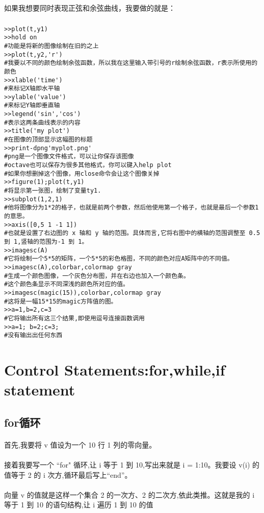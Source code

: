 \documentclass{article}
\begin{document}
\begin{CJK}{UTF8}{gbsn}
\paragraph{}
如果我想要同时表现正弦和余弦曲线，我要做的就是：
\subparagraph{}
\begin{verbatim}
>>plot(t,y1)
>>hold on
#功能是将新的图像绘制在旧的之上
>>plot(t,y2,'r')
#我要以不同的颜色绘制余弦函数，所以我在这里输入带引号的r绘制余弦函数，r表示所使用的颜色
>>xlable('time')
#来标记X轴即水平轴
>>ylable('value')
#来标记Y轴即垂直轴
>>legend('sin','cos')
#表示这两条曲线表示的内容
>>title('my plot')
#在图像的顶部显示这幅图的标题
>>print-dpng'myplot.png'
#png是一个图像文件格式，可以让你保存该图像
#octave也可以保存为很多其他格式，你可以键入help plot
#如果你想删掉这个图像，用close命令会让这个图像关掉
>>figure(1);plot(t,y1)
#将显示第一张图，绘制了变量ty1.
>>subplot(1,2,1)
#他将图像分为1*2的格子，也就是前两个参数，然后他使用第一个格子，也就是最后一个参数1的意思。
>>axis([0,5 1 -1 1])
#也就是设置了右边图的 x 轴和 y 轴的范围。具体而言,它将右图中的横轴的范围调整至 0.5
到 1,竖轴的范围为-1 到 1。
>>imagesc(A)
#它将绘制一个5*5的矩阵，一个5*5的彩色格图，不同的颜色对应A矩阵中的不同值。
>>imagesc(A),colorbar,colormap gray
#生成一个颜色图像，一个灰色分布图，并在右边也加入一个颜色条。
#这个颜色条显示不同深浅的颜色所对应的值。
>>imagesc(magic(15)),colorbar,colormap gray
#这将是一幅15*15的magic方阵值的图。
>>a=1,b=2,c=3
#它将输出所有这三个结果,即使用逗号连接函数调用
>>a=1; b=2;c=3;
#没有输出出任何东西
\end{verbatim}
\section{Control Statements:for,while,if statement}
\subsection{for循环}
\paragraph{}
首先,我要将 v 值设为一个 10 行 1 列的零向量。
\paragraph{}
接着我要写一个 “for" 循环,让 i 等于 1 到 10,写出来就是 i = 1:10。我要设 v(i) 的值等于 2 的 i 次方,循环最后写上“end”。
\paragraph{}
向量 v 的值就是这样一个集合 2 的一次方、2 的二次方,依此类推。这就是我的 i 等于 1 到 10 的语句结构,让 i 遍历 1 到 10 的值

\end{CJK}
\end{document}
